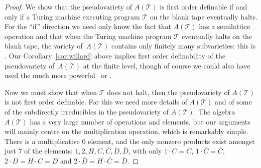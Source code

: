 \documentclass[reqno]{amsart}
\theoremstyle{plain}
\theoremstyle{definition}
\begin{document}
\begin{proof}
We show that the pseudovariety of $A(\mathcal{T})$ is first order definable if and only if a Turing machine executing program $\mathcal{T}$ on the blank tape eventually halts.  For the ``if'' direction we need only know the fact that $A(\mathcal{T})$ has a semilattice operation and that when the Turing machine program $\mathcal{T}$ eventually halts on the blank tape, the variety of~$A(\mathcal{T})$ contains only finitely many subvarieties: this is \cite[Theorem~5.1]{mck2}.  Our Corollary~\ref{cor:willard} above implies first order definability of the pseudovariety of~$A(\mathcal{T})$ at the finite level, though of course we could also have used the much more powerful~\cite{wil} or \cite{wil2}.

Now we must show that when $\mathcal{T}$ does not halt, then the pseudovariety of $A(\mathcal{T})$ is not first order definable.  For this we need more details of $A(\mathcal{T})$ and of some of the subdirectly irreducibles in the pseudovariety of $A(\mathcal{T})$.  The algebra $A(\mathcal{T})$ has a very large number of operations and elements, but our arguments will mainly centre on the multiplication operation, which is remarkably simple.  There is a multiplicative $0$ element, and the only nonzero products exist amongst just 7 of the elements: $1,2,H,C, \bar{C},D,\bar{D}$, with only $1\cdot C=C$, $1\cdot \bar{C}=\bar{C}$, $2\cdot D=H\cdot C=D$ and $2\cdot \bar{D}=H\cdot \bar{C}=\bar{D}$.   

\medskip


\end{proof}
\end{document}
